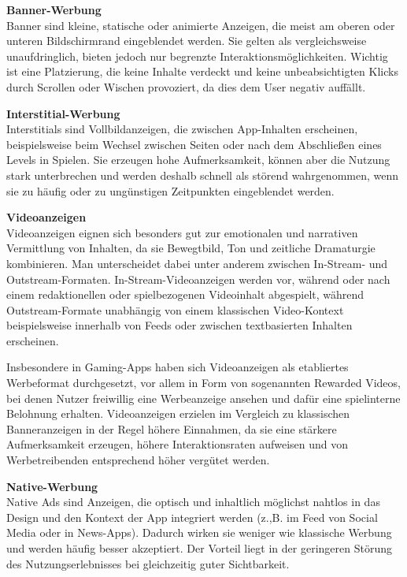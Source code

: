 \textbf{Banner-Werbung}\\
Banner sind kleine, statische oder animierte Anzeigen, die meist am oberen oder unteren Bildschirmrand eingeblendet werden. Sie gelten als vergleichsweise unaufdringlich, bieten jedoch nur begrenzte Interaktionsmöglichkeiten. Wichtig ist eine Platzierung, die keine Inhalte verdeckt und keine unbeabsichtigten Klicks durch Scrollen oder Wischen provoziert, da dies dem User negativ auffällt.\cite{Werbung_HubSpot}\cite{Werbung_knuguru}

\textbf{Interstitial-Werbung}\\
Interstitials sind Vollbildanzeigen, die zwischen App-Inhalten erscheinen, beispielsweise beim Wechsel zwischen Seiten oder nach dem Abschließen eines Levels in Spielen. Sie erzeugen hohe Aufmerksamkeit, können aber die Nutzung stark unterbrechen und werden deshalb schnell als störend wahrgenommen, wenn sie zu häufig oder zu ungünstigen Zeitpunkten eingeblendet werden.\cite{Werbung_HubSpot}\cite{Werbung_knuguru}

\textbf{Videoanzeigen}\\
Videoanzeigen eignen sich besonders gut zur emotionalen und narrativen Vermittlung von Inhalten, da sie Bewegtbild, Ton und zeitliche Dramaturgie kombinieren. Man unterscheidet dabei unter anderem zwischen In-Stream- und Outstream-Formaten. In-Stream-Videoanzeigen werden vor, während oder nach einem redaktionellen oder spielbezogenen Videoinhalt abgespielt, während Outstream-Formate unabhängig von einem klassischen Video-Kontext beispielsweise innerhalb von Feeds oder zwischen textbasierten Inhalten erscheinen.

Insbesondere in Gaming-Apps haben sich Videoanzeigen als etabliertes Werbeformat durchgesetzt, vor allem in Form von sogenannten Rewarded Videos, bei denen Nutzer freiwillig eine Werbeanzeige ansehen und dafür eine spielinterne Belohnung erhalten. Videoanzeigen erzielen im Vergleich zu klassischen Banneranzeigen in der Regel höhere Einnahmen, da sie eine stärkere Aufmerksamkeit erzeugen, höhere Interaktionsraten aufweisen und von Werbetreibenden entsprechend höher vergütet werden. \cite{Werbung_HubSpot}\cite{Werbung_knuguru}

\textbf{Native-Werbung}\\
Native Ads sind Anzeigen, die optisch und inhaltlich möglichst nahtlos in das Design und den Kontext der App integriert werden (z.,B. im Feed von Social Media oder in News-Apps). Dadurch wirken sie weniger wie klassische Werbung und werden häufig besser akzeptiert. Der Vorteil liegt in der geringeren Störung des Nutzungserlebnisses bei gleichzeitig guter Sichtbarkeit.\cite{Werbung_HubSpot}\cite{Werbung_knuguru}

